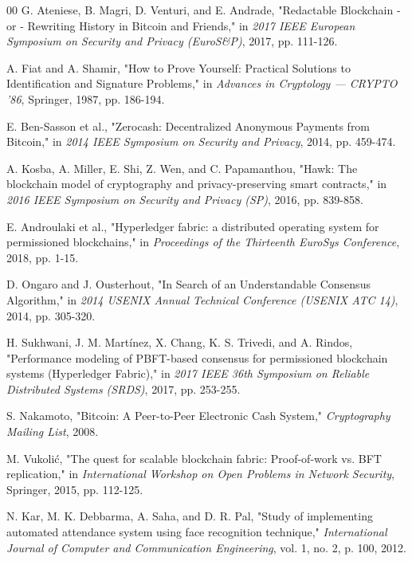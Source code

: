 \documentclass[conference]{IEEEtran}
\begin{document}
\begin{thebibliography}{00}
G. Ateniese, B. Magri, D. Venturi, and E. Andrade, 
"Redactable Blockchain - or - Rewriting History in Bitcoin and Friends," 
in \textit{2017 IEEE European Symposium on Security and Privacy (EuroS\&P)}, 2017, pp. 111-126.

A. Fiat and A. Shamir, 
"How to Prove Yourself: Practical Solutions to Identification and Signature Problems," 
in \textit{Advances in Cryptology — CRYPTO ’86}, Springer, 1987, pp. 186-194.

E. Ben-Sasson et al., 
"Zerocash: Decentralized Anonymous Payments from Bitcoin," 
in \textit{2014 IEEE Symposium on Security and Privacy}, 2014, pp. 459-474.

A. Kosba, A. Miller, E. Shi, Z. Wen, and C. Papamanthou, 
"Hawk: The blockchain model of cryptography and privacy-preserving smart contracts," 
in \textit{2016 IEEE Symposium on Security and Privacy (SP)}, 2016, pp. 839-858.

E. Androulaki et al., 
"Hyperledger fabric: a distributed operating system for permissioned blockchains," 
in \textit{Proceedings of the Thirteenth EuroSys Conference}, 2018, pp. 1-15.

D. Ongaro and J. Ousterhout, 
"In Search of an Understandable Consensus Algorithm," 
in \textit{2014 USENIX Annual Technical Conference (USENIX ATC 14)}, 2014, pp. 305-320.

H. Sukhwani, J. M. Martínez, X. Chang, K. S. Trivedi, and A. Rindos, 
"Performance modeling of PBFT-based consensus for permissioned blockchain systems (Hyperledger Fabric)," 
in \textit{2017 IEEE 36th Symposium on Reliable Distributed Systems (SRDS)}, 2017, pp. 253-255.

S. Nakamoto, 
"Bitcoin: A Peer-to-Peer Electronic Cash System," 
\textit{Cryptography Mailing List}, 2008.

M. Vukolić, 
"The quest for scalable blockchain fabric: Proof-of-work vs. BFT replication," 
in \textit{International Workshop on Open Problems in Network Security}, Springer, 2015, pp. 112-125.

N. Kar, M. K. Debbarma, A. Saha, and D. R. Pal, 
"Study of implementing automated attendance system using face recognition technique," 
\textit{International Journal of Computer and Communication Engineering}, vol. 1, no. 2, p. 100, 2012.


\end{thebibliography}
\end{document}

